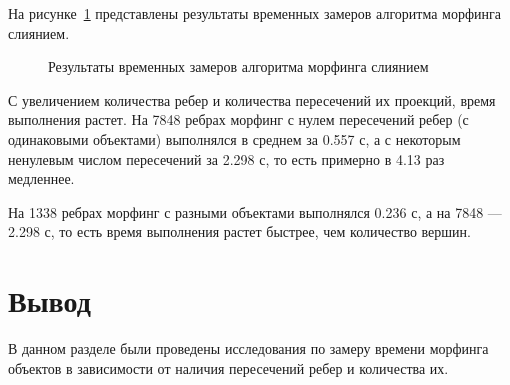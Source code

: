 На рисунке~\ref{img:cpu_times} представлены результаты временных замеров алгоритма морфинга слиянием.

\begin{figure}[h]
	\centering
	
	\caption{Результаты временных замеров алгоритма морфинга слиянием}
	\label{img:cpu_times}
\end{figure}

\pagebreak

С увеличением количества ребер и количества пересечений их проекций, время выполнения растет. На 7848 ребрах морфинг с нулем пересечений ребер (с одинаковыми объектами) выполнялся в среднем за 0.557 с, а с некоторым ненулевым числом пересечений за 2.298 с, то есть примерно в 4.13 раз медленнее.

На 1338 ребрах морфинг с разными объектами выполнялся 0.236 с, а на 7848 --- 2.298 с, то есть время выполнения растет быстрее, чем количество вершин.

\section*{Вывод}

В данном разделе были проведены исследования по замеру времени морфинга объектов в зависимости от наличия пересечений ребер и количества их.

